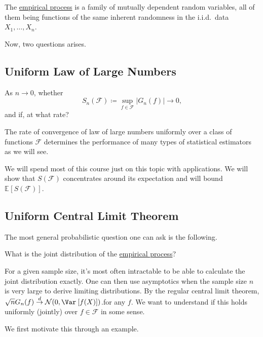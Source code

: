 \begin{remark}
	The \hyperref[def:EP]{empirical process} is a family of mutually dependent random variables, all of them being functions of the same inherent randomness in the i.i.d.\ data \(X_1, \dots , X_n \).
\end{remark}

Now, two questions arises.

\subsection{Uniform Law of Large Numbers}
As \(n \to 0\), whether
\[
	S_n(\mathscr{F} ) \coloneqq \sup _{f\in \mathscr{F} } \vert G_n(f) \vert \to 0,
\]
and if, at what rate?

\begin{remark}
	The rate of convergence of law of large numbers uniformly over a class of functions \(\mathscr{F} \) determines the performance of many types of statistical estimators as we will see.
\end{remark}

We will spend most of this course just on this topic with applications. We will show that \(S(\mathscr{F} )\) concentrates around its expectation and will bound \(\mathbb{E}_{}\left[S(\mathscr{F} ) \right] \).

\subsection{Uniform Central Limit Theorem}
The most general probabilistic question one can ask is the following.

\begin{problem*}
	What is the joint distribution of the \hyperref[def:EP]{empirical process}?
\end{problem*}
\begin{answer}
	For a given sample size, it's most often intractable to be able to calculate the joint distribution exactly. One can then use asymptotics when the sample size \(n\) is very large to derive limiting distributions. By the regular central limit theorem, \(\sqrt{n} G_n(f) \overset{d}{\to} \mathcal{N} (0, \Var_{}\left[f(X) \right] )\).for any \(f\). We want to understand if this holds uniformly (jointly) over \(f\in \mathscr{F} \) in some sense.
\end{answer}

We first motivate this through an example.

